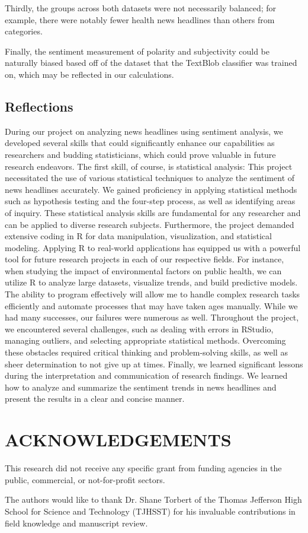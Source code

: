 \documentclass[12pt]{article}
\begin{document}
Thirdly, the groups across both datasets were not necessarily balanced; for example, there were notably fewer health news headlines than others from categories.

Finally, the sentiment measurement of polarity and subjectivity could be naturally biased based off of the dataset that the TextBlob classifier was trained on, which may be reflected in our calculations.

\subsection{Reflections}

During our project on analyzing news headlines using sentiment analysis, we developed several skills that could significantly enhance our capabilities as researchers and budding statisticians, which could prove valuable in future research endeavors. The first skill, of course, is statistical analysis: This project necessitated the use of various statistical techniques to analyze the sentiment of news headlines accurately. We gained proficiency in applying statistical methods such as hypothesis testing and the four-step process, as well as identifying areas of inquiry. These statistical analysis skills are fundamental for any researcher and can be applied to diverse research subjects. Furthermore, the project demanded extensive coding in R for data manipulation, visualization, and statistical modeling. Applying R to real-world applications has equipped us with a powerful tool for future research projects in each of our respective fields. For instance, when studying the impact of environmental factors on public health, we can utilize R to analyze large datasets, visualize trends, and build predictive models. The ability to program effectively will allow me to handle complex research tasks efficiently and automate processes that may have taken ages manually. While we had many successes, our failures were numerous as well. Throughout the project, we encountered several challenges, such as dealing with errors in RStudio, managing outliers, and selecting appropriate statistical methods. Overcoming these obstacles required critical thinking and problem-solving skills, as well as sheer determination to not give up at times. Finally, we learned significant lessons during the interpretation and communication of research findings. We learned how to analyze and summarize the sentiment trends in news headlines and present the results in a clear and concise manner.

\section{ACKNOWLEDGEMENTS}

This research did not receive any specific grant from funding agencies in the public, commercial, or not-for-profit sectors. 

The authors would like to thank Dr. Shane Torbert of the Thomas Jefferson High School for Science and Technology (TJHSST) for his invaluable contributions in field knowledge and manuscript review.



\end{document}
